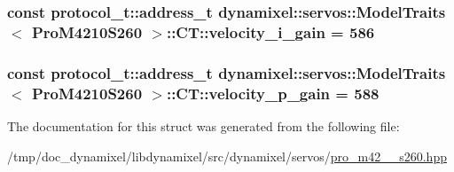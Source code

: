 \subsubsection[{\texorpdfstring{velocity\+\_\+i\+\_\+gain}{velocity_i_gain}}]{\setlength{\rightskip}{0pt plus 5cm}const {\bf protocol\+\_\+t\+::address\+\_\+t} {\bf dynamixel\+::servos\+::\+Model\+Traits}$<$ {\bf Pro\+M4210\+S260} $>$\+::C\+T\+::velocity\+\_\+i\+\_\+gain = 586\hspace{0.3cm}{\ttfamily [static]}}\hypertarget{structdynamixel_1_1servos_1_1_model_traits_3_01_pro_m4210_s260_01_4_1_1_c_t_ac45c584e34c133dbb96fc1efa6c1f08a}{}\label{structdynamixel_1_1servos_1_1_model_traits_3_01_pro_m4210_s260_01_4_1_1_c_t_ac45c584e34c133dbb96fc1efa6c1f08a}
\subsubsection[{\texorpdfstring{velocity\+\_\+p\+\_\+gain}{velocity_p_gain}}]{\setlength{\rightskip}{0pt plus 5cm}const {\bf protocol\+\_\+t\+::address\+\_\+t} {\bf dynamixel\+::servos\+::\+Model\+Traits}$<$ {\bf Pro\+M4210\+S260} $>$\+::C\+T\+::velocity\+\_\+p\+\_\+gain = 588\hspace{0.3cm}{\ttfamily [static]}}\hypertarget{structdynamixel_1_1servos_1_1_model_traits_3_01_pro_m4210_s260_01_4_1_1_c_t_a5215fcc5863f28fafa01d7b6e8b692eb}{}\label{structdynamixel_1_1servos_1_1_model_traits_3_01_pro_m4210_s260_01_4_1_1_c_t_a5215fcc5863f28fafa01d7b6e8b692eb}


The documentation for this struct was generated from the following file\+:\begin{DoxyCompactItemize}
\item 
/tmp/doc\+\_\+dynamixel/libdynamixel/src/dynamixel/servos/\hyperlink{pro__m42__10__s260_8hpp}{pro\+\_\+m42\+\_\+\_\+s260.\+hpp}\end{DoxyCompactItemize}
